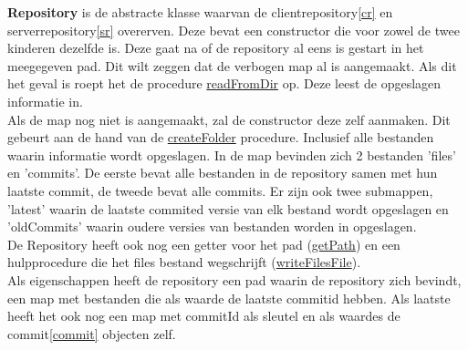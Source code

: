 \documentclass{article}
\begin{document}
\textbf{Repository} is de abstracte klasse waarvan de clientrepository\ref{cr} en serverrepository\ref{sr} overerven. Deze bevat een constructor die voor zowel de twee kinderen dezelfde is. Deze gaat na of de repository al eens is gestart in het meegegeven pad. Dit wilt zeggen dat de verbogen map al is aangemaakt. Als dit het geval is roept het de procedure \underline{readFromDir} op. Deze leest de opgeslagen informatie in.\\
Als de map nog niet is aangemaakt, zal de constructor deze zelf aanmaken. Dit gebeurt aan de hand van de \underline{createFolder} procedure. Inclusief alle bestanden waarin informatie wordt opgeslagen. In de map bevinden zich 2 bestanden 'files' en 'commits'. De eerste bevat alle bestanden in de repository samen met hun laatste commit, de tweede bevat alle commits. Er zijn ook twee submappen, 'latest' waarin de laatste commited versie van elk bestand wordt opgeslagen en 'oldCommits' waarin oudere versies van bestanden worden in opgeslagen.\\
De Repository heeft ook nog een getter voor het pad (\underline{getPath}) en een hulpprocedure die het files bestand wegschrijft (\underline{writeFilesFile}).\\
Als eigenschappen heeft de repository een pad waarin de repository zich bevindt, een map met bestanden die als waarde de laatste commitid hebben. Als laatste heeft het ook nog een map met commitId als sleutel en als waardes de commit\ref{commit} objecten zelf.\\
\end{document}

